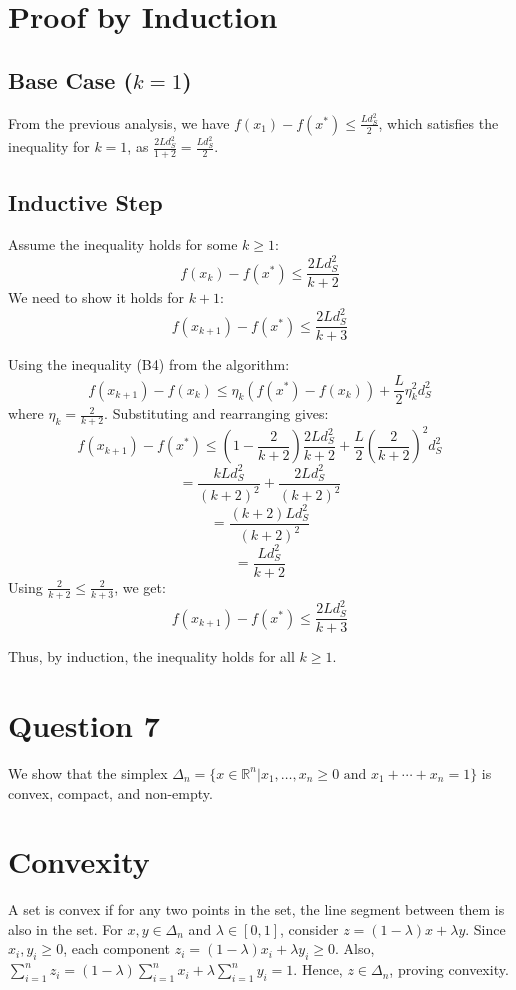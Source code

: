 \documentclass[12p]{article}
\begin{document}
\section*{Proof by Induction}

\subsection*{Base Case (\( k = 1 \))}
From the previous analysis, we have \( f(x_1) - f(x^*) \leq \frac{Ld^2_S}{2} \), which satisfies the inequality for \( k = 1 \), as \( \frac{2Ld^2_S}{1+2} = \frac{Ld^2_S}{2} \).

\subsection*{Inductive Step}
Assume the inequality holds for some \( k \geq 1 \):
\[ f(x_k) - f(x^*) \leq \frac{2Ld^2_S}{k+2} \]
We need to show it holds for \( k+1 \):
\[ f(x_{k+1}) - f(x^*) \leq \frac{2Ld^2_S}{k+3} \]

Using the inequality (B4) from the algorithm:
\[ f(x_{k+1}) - f(x_k) \leq \eta_k (f(x^*) - f(x_k)) + \frac{L}{2} \eta_k^2 d^2_S \]
where \( \eta_k = \frac{2}{k+2} \). Substituting and rearranging gives:
\[ f(x_{k+1}) - f(x^*) \leq \left(1 - \frac{2}{k+2}\right) \frac{2Ld^2_S}{k+2} + \frac{L}{2} \left(\frac{2}{k+2}\right)^2 d^2_S \]
\[ = \frac{kLd^2_S}{(k+2)^2} + \frac{2Ld^2_S}{(k+2)^2} \]
\[ = \frac{(k+2)Ld^2_S}{(k+2)^2} \]
\[ = \frac{Ld^2_S}{k+2} \]
Using \( \frac{2}{k+2} \leq \frac{2}{k+3} \), we get:
\[ f(x_{k+1}) - f(x^*) \leq \frac{2Ld^2_S}{k+3} \]

Thus, by induction, the inequality holds for all \( k \geq 1 \).


\section*{Question 7} 

We show that the simplex \( \Delta_n = \{x \in \mathbb{R}^n | x_1, \ldots, x_n \geq 0 \text{ and } x_1 + \cdots + x_n = 1\} \) is convex, compact, and non-empty.

\section*{Convexity}
A set is convex if for any two points in the set, the line segment between them is also in the set. For \( x, y \in \Delta_n \) and \( \lambda \in [0, 1] \), consider \( z = (1 - \lambda)x + \lambda y \). Since \( x_i, y_i \geq 0 \), each component \( z_i = (1 - \lambda)x_i + \lambda y_i \geq 0 \). Also, \( \sum_{i=1}^n z_i = (1 - \lambda)\sum_{i=1}^n x_i + \lambda\sum_{i=1}^n y_i = 1 \). Hence, \( z \in \Delta_n \), proving convexity.
\end{document}
